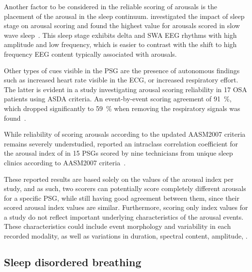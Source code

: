             Another factor to be considered in the reliable scoring of arousals is the placement of the arousal in the sleep continuum.
            \citeauthor{Drinnan1998} investigated the impact of sleep stage on arousal scoring and found the highest \cohen value for arousals scored in slow wave sleep~\cite{Drinnan1998}.
            This sleep stage exhibits delta and \ac{SWA} \ac{EEG} rhythms with high amplitude and low frequency, which is easier to contrast with the shift to high frequency \ac{EEG} content typically associated with arousals.
            
            Other types of cues visible in the \ac{PSG} are the presence of autonomous findings such as increased heart rate visible in the \ac{ECG}, or increased respiratory effort.
            The latter is evident in a study investigating arousal scoring reliability in 17 \ac{OSA} patients using \ac{ASDA} criteria. 
            An event-by-event scoring agreement of \SI{91}{\percent}, which dropped significantly to \SI{59}{\percent} when removing the respiratory signals was found~\cite{Thomas2003}.
            
            While reliability of scoring arousals according to the updated \ac{AASM}2007 criteria remains severely understudied, \citeauthor{Magalang2013} reported an intraclass correlation coefficient for the arousal index of  in 15 \acp{PSG} scored by nine technicians from unique sleep clinics according to \ac{AASM}2007 criteria~\cite{Magalang2013}.
            
            These reported results are based solely on the values of the arousal index per study, and as such, two scorers can potentially score completely different arousals for a specific \ac{PSG}, while still having good agreement between them, since their scored arousal index values are similar. 
            Furthermore, scoring only index values for a study do not reflect important underlying characteristics of the arousal events.
            These characteristics could include event morphology and variability in each recorded modality, as well as variations in duration, spectral content, amplitude, \etc.
           
            
            
        \subsection{Sleep disordered breathing}\label{sec:challenges-sdb}
        
